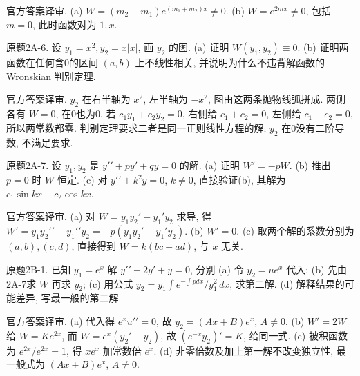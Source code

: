 \begin{solution}
官方答案译审. (a) $W=(m_2-m_1)e^{(m_1+m_2)x}\ne0$. (b) $W=e^{2mx}\ne0$, 包括 $m=0$, 此时函数对为 $1,x$.
\end{solution}
\begin{exercise}\label{cw:bank-2A-6}
原题2A-6. 设 $y_1=x^2,y_2=x|x|$, 画 $y_2$ 的图. (a) 证明 $W(y_1,y_2)\equiv0$. (b) 证明两函数在任何含0的区间 $(a,b)$ 上不线性相关, 并说明为什么不违背解函数的 Wronskian 判别定理.
\end{exercise}
\begin{solution}
官方答案译审. $y_2$ 在右半轴为 $x^2$, 左半轴为 $-x^2$, 图由这两条抛物线弧拼成. 两侧各有 $W=0$, 在0也为0. 若 $c_1y_1+c_2y_2=0$, 右侧给 $c_1+c_2=0$, 左侧给 $c_1-c_2=0$, 所以两常数都零. 判别定理要求二者是同一正则线性方程的解; $y_2$ 在0没有二阶导数, 不满足要求.\begin{center}\end{center}
\end{solution}
\begin{exercise}\label{cw:bank-2A-7}
原题2A-7. 设 $y_1,y_2$ 是 $y\prime\prime+py\prime+qy=0$ 的解. (a) 证明 $W\prime=-pW$. (b) 推出 $p=0$ 时 $W$ 恒定. (c) 对 $y\prime\prime+k^2y=0$, $k\ne0$, 直接验证(b), 其解为 $c_1\sin kx+c_2\cos kx$.
\end{exercise}
\begin{solution}
官方答案译审. (a) 对 $W=y_1y_2\prime-y_1\prime y_2$ 求导, 得 $W\prime=y_1y_2\prime\prime-y_1\prime\prime y_2=-p(y_1y_2\prime-y_1\prime y_2)$. (b) $W\prime=0$. (c) 取两个解的系数分别为 $(a,b),(c,d)$, 直接得到 $W=k(bc-ad)$, 与 $x$ 无关.
\end{solution}
\begin{exercise}\label{cw:bank-2B-1}
原题2B-1. 已知 $y_1=e^x$ 解 $y\prime\prime-2y\prime+y=0$, 分别 (a) 令 $y_2=ue^x$ 代入; (b) 先由2A-7求 $W$ 再求 $y_2$; (c) 用公式 $y_2=y_1\int e^{-\int p dx}/y_1^2\,dx$, 求第二解. (d) 解释结果的可能差异, 写最一般的第二解.
\end{exercise}
\begin{solution}
官方答案译审. (a) 代入得 $e^xu\prime\prime=0$, 故 $y_2=(Ax+B)e^x$, $A\ne0$. (b) $W\prime=2W$ 给 $W=Ke^{2x}$, 而 $W=e^x(y_2\prime-y_2)$, 故 $(e^{-x}y_2)\prime=K$, 给同一式. (c) 被积函数为 $e^{2x}/e^{2x}=1$, 得 $xe^x$ 加常数倍 $e^x$. (d) 非零倍数及加上第一解不改变独立性, 最一般式为 $(Ax+B)e^x$, $A\ne0$.
\end{solution}

